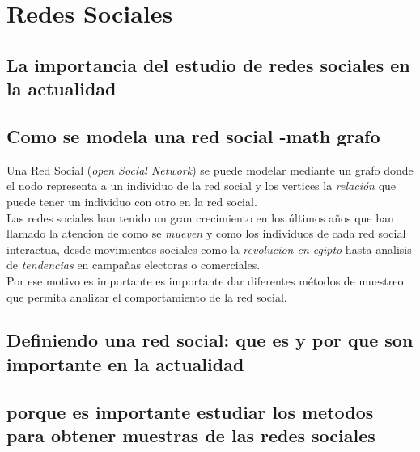 
\chapter{Redes Sociales} %
\label{Chapter3}


\section{La importancia del estudio de redes sociales en la actualidad}
\section{Como se modela  una red social -math grafo}
Una Red Social (\emph{open Social Network}) se puede modelar mediante un grafo
 donde el nodo representa a un individuo de la red social
y los vertices la \emph{relaci\'on} que puede tener un individuo con otro en la
red social.\\


Las redes sociales han tenido un gran crecimiento  en
los \'ultimos a\~nos que han llamado la atencion de como se\emph{ mueven} y como los
individuos de cada red social interactua, desde movimientos sociales como la
\emph{revolucion en egipto}  hasta  analisis de
\emph{tendencias} en campa\~nas electoras o comerciales.\\

Por ese motivo es importante es importante dar diferentes m\'etodos de muestreo
que permita analizar el comportamiento de la red social. 




\section {Definiendo una red social: que es  y por que son importante en
  la actualidad}

\section {porque es importante estudiar los metodos para obtener muestras de
  las redes sociales}

